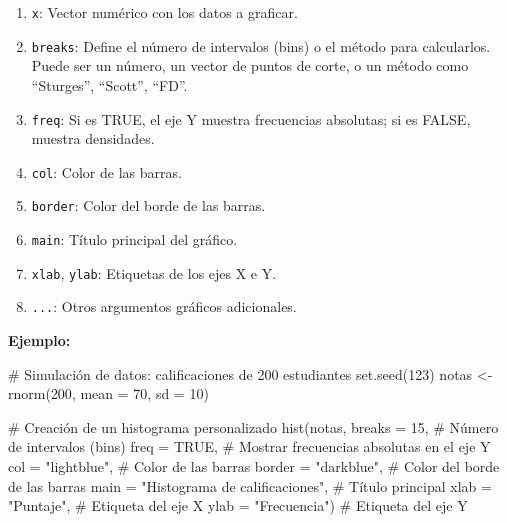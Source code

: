 \documentclass[
  spanish,
  a4paper,
  DIV=11,
  numbers=noendperiod,
  onepage,
  openany]{scrreprt}
\newenvironment{Shaded}{\begin{snugshade}}{\end{snugshade}}
\newcommand{\AttributeTok}[1]{\textcolor[rgb]{0.40,0.45,0.13}{#1}}
\newcommand{\CommentTok}[1]{\textcolor[rgb]{0.37,0.37,0.37}{#1}}
\newcommand{\ConstantTok}[1]{\textcolor[rgb]{0.56,0.35,0.01}{#1}}
\newcommand{\DecValTok}[1]{\textcolor[rgb]{0.68,0.00,0.00}{#1}}
\newcommand{\FunctionTok}[1]{\textcolor[rgb]{0.28,0.35,0.67}{#1}}
\newcommand{\NormalTok}[1]{\textcolor[rgb]{0.00,0.23,0.31}{#1}}
\newcommand{\OtherTok}[1]{\textcolor[rgb]{0.00,0.23,0.31}{#1}}
\newcommand{\StringTok}[1]{\textcolor[rgb]{0.13,0.47,0.30}{#1}}
\begin{document}
\begin{enumerate}
\def\labelenumi{\arabic{enumi}.}
\item
  \texttt{x}: Vector numérico con los datos a graficar.
\item
  \texttt{breaks}: Define el número de intervalos (bins) o el método
  para calcularlos. Puede ser un número, un vector de puntos de corte, o
  un método como ``Sturges'', ``Scott'', ``FD''.
\item
  \texttt{freq}: Si es TRUE, el eje Y muestra frecuencias absolutas; si
  es FALSE, muestra densidades.
\item
  \texttt{col}: Color de las barras.
\item
  \texttt{border}: Color del borde de las barras.
\item
  \texttt{main}: Título principal del gráfico.
\item
  \texttt{xlab}, \texttt{ylab}: Etiquetas de los ejes X e Y.
\item
  \texttt{...}: Otros argumentos gráficos adicionales.
\end{enumerate}

\textbf{Ejemplo:}

\begin{Shaded}
\begin{Highlighting}[]
\CommentTok{\# Simulación de datos: calificaciones de 200 estudiantes}
\FunctionTok{set.seed}\NormalTok{(}\DecValTok{123}\NormalTok{)}
\NormalTok{notas }\OtherTok{\textless{}{-}} \FunctionTok{rnorm}\NormalTok{(}\DecValTok{200}\NormalTok{, }\AttributeTok{mean =} \DecValTok{70}\NormalTok{, }\AttributeTok{sd =} \DecValTok{10}\NormalTok{)}

\CommentTok{\# Creación de un histograma personalizado}
\FunctionTok{hist}\NormalTok{(notas,}
     \AttributeTok{breaks =} \DecValTok{15}\NormalTok{,         }\CommentTok{\# Número de intervalos (bins)}
     \AttributeTok{freq =} \ConstantTok{TRUE}\NormalTok{,         }\CommentTok{\# Mostrar frecuencias absolutas en el eje Y}
     \AttributeTok{col =} \StringTok{"lightblue"}\NormalTok{,   }\CommentTok{\# Color de las barras}
     \AttributeTok{border =} \StringTok{"darkblue"}\NormalTok{, }\CommentTok{\# Color del borde de las barras}
     \AttributeTok{main =} \StringTok{"Histograma de calificaciones"}\NormalTok{, }\CommentTok{\# Título principal}
     \AttributeTok{xlab =} \StringTok{"Puntaje"}\NormalTok{,    }\CommentTok{\# Etiqueta del eje X}
     \AttributeTok{ylab =} \StringTok{"Frecuencia"}\NormalTok{) }\CommentTok{\# Etiqueta del eje Y}
\end{Highlighting}
\end{Shaded}
\end{document}
